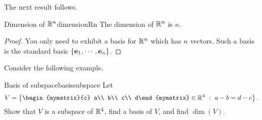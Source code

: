 The next result follows.

\begin{corollary}{Dimension of $\mathbb{R}^n$}{dimensionRn}
The dimension of $\mathbb{R}^{n}$ is $n.$ 
\end{corollary}

\begin{proof}
You only need to exhibit a basis for $\mathbb{R}^{n}$ which
has $n$ vectors. Such a basis is the standard basis $\left\{{\bf e}_{1},\cdots , {\bf e}_{n}\right\} $.
\end{proof}

Consider the following example.

\begin{example}{Basis of subspace}{basissubspace}
Let 
\[ V=\set{
\begin{mymatrix}{c} a\\ b\\ c\\ d\end{mymatrix}\in\R^4
~:~ a-b=d-c }.\]
Show that $V$ is a subspace of $\mathbb{R}^4$,
find a basis of $V$, and find $\dim(V)$.
\end{example}

